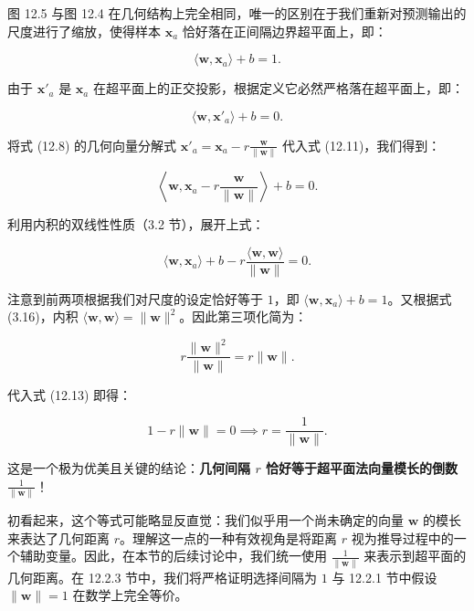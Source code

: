 图 12.5 与图 12.4 在几何结构上完全相同，唯一的区别在于我们重新对预测输出的尺度进行了缩放，使得样本 $ \boldsymbol{x}_a $ 恰好落在正间隔边界超平面上，即：

\begin{equation*}
\langle \boldsymbol{w}, \boldsymbol{x}_a \rangle + b = 1 .
\end{equation*}

由于 $ \boldsymbol{x}'_a $ 是 $ \boldsymbol{x}_a $ 在超平面上的正交投影，根据定义它必然严格落在超平面上，即：

\begin{equation}
\langle \boldsymbol{w}, \boldsymbol{x}'_a \rangle + b = 0 .
\tag{12.11}
\end{equation}

将式 (12.8) 的几何向量分解式 $ \boldsymbol{x}'_a = \boldsymbol{x}_a - r \frac{\boldsymbol{w}}{\|\boldsymbol{w}\|} $ 代入式 (12.11)，我们得到：

\begin{equation}
\left\langle \boldsymbol{w}, \boldsymbol{x}_a - r \frac{\boldsymbol{w}}{\|\boldsymbol{w}\|} \right\rangle + b = 0 .
\tag{12.12}
\end{equation}

利用内积的双线性性质（3.2 节），展开上式：

\begin{equation}
\langle \boldsymbol{w}, \boldsymbol{x}_a \rangle + b - r \frac{\langle \boldsymbol{w}, \boldsymbol{w} \rangle}{\|\boldsymbol{w}\|} = 0 .
\tag{12.13}
\end{equation}

注意到前两项根据我们对尺度的设定恰好等于 $ 1 $，即 $ \langle \boldsymbol{w}, \boldsymbol{x}_a \rangle + b = 1 $。又根据式 (3.16)，内积 $ \langle \boldsymbol{w}, \boldsymbol{w} \rangle = \|\boldsymbol{w}\|^2 $。因此第三项化简为：

\begin{equation*}
r \frac{\|\boldsymbol{w}\|^2}{\|\boldsymbol{w}\|} = r \|\boldsymbol{w}\| .
\end{equation*}

代入式 (12.13) 即得：

\begin{equation}
1 - r \|\boldsymbol{w}\| = 0 \implies r = \frac{1}{\|\boldsymbol{w}\|} .
\tag{12.14}
\end{equation}

这是一个极为优美且关键的结论：\textbf{几何间隔 $ r $ 恰好等于超平面法向量模长的倒数 $ \frac{1}{\|\boldsymbol{w}\|} $}！

初看起来，这个等式可能略显反直觉：我们似乎用一个尚未确定的向量 $ \boldsymbol{w} $ 的模长来表达了几何距离 $ r $。理解这一点的一种有效视角是将距离 $ r $ 视为推导过程中的一个辅助变量。因此，在本节的后续讨论中，我们统一使用 $ \frac{1}{\|\boldsymbol{w}\|} $ 来表示到超平面的几何距离。在 12.2.3 节中，我们将严格证明选择间隔为 $ 1 $ 与 12.2.1 节中假设 $ \|\boldsymbol{w}\| = 1 $ 在数学上完全等价。

